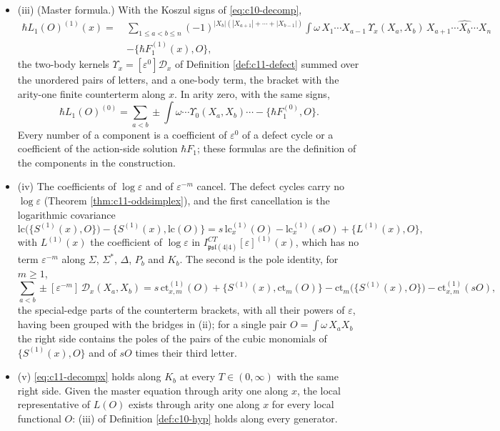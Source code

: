 \begin{theorem}
\begin{itemize}
\item (iii) (Master formula.) With the Koszul signs of \eqref{eq:c10-decomp},
\begin{equation}
\begin{aligned}
\hbar L_1(O)^{(1)}(x)=\ &\sum_{1\le a<b\le n}(-1)^{|X_b|(|X_{a+1}|+\cdots+|X_{b-1}|)}\int\omega\,X_1\cdots X_{a-1}\,\Upsilon_x(X_a,X_b)\,X_{a+1}\cdots\widehat{X_b}\cdots X_n\\
&-\big\{\hbar F_1^{(1)}(x),O\big\},
\end{aligned}
\label{eq:c11-decompx}
\end{equation}
the two-body kernels $\Upsilon_x=[\varepsilon^0]\mathcal D_x$ of Definition \ref{def:c11-defect} summed over the unordered pairs of letters, and a one-body term, the bracket with the arity-one finite counterterm along $x$. In arity zero, with the same signs,
\begin{equation}
\hbar L_1(O)^{(0)}=\sum_{a<b}\pm\int\omega\cdots\Upsilon_0(X_a,X_b)\cdots-\big\{\hbar F_1^{(0)},O\big\}.
\label{eq:c11-decomp0}
\end{equation}
Every number of a component is a coefficient of $\varepsilon^0$ of a defect cycle or a coefficient of the action-side solution $\hbar F_1$; these formulas are the definition of the components in the construction.
\item (iv) The coefficients of $\log\varepsilon$ and of $\varepsilon^{-m}$ cancel. The defect cycles carry no $\log\varepsilon$ (Theorem \ref{thm:c11-oddsimplex}), and the first cancellation is the logarithmic covariance
\begin{equation}
\mathrm{lc}\big(\{S^{(1)}(x),O\}\big)-\big\{S^{(1)}(x),\mathrm{lc}(O)\big\}=s\,\mathrm{lc}^{(1)}_x(O)-\mathrm{lc}^{(1)}_x(sO)+\big\{L^{(1)}(x),O\big\},
\label{eq:c11-logcov}
\end{equation}
with $L^{(1)}(x)$ the coefficient of $\log\varepsilon$ in $I^{CT}_{\mathfrak{psl}(4|4)}[\varepsilon]^{(1)}(x)$, which has no term $\varepsilon^{-m}$ along $\Sigma$, $\Sigma^*$, $\Delta$, $P_b$ and $K_b$. The second is the pole identity, for $m\ge1$,
\begin{equation}
\sum_{a<b}\pm[\varepsilon^{-m}]\,\mathcal D_x(X_a,X_b)=s\,\mathrm{ct}^{(1)}_{x,m}(O)+\big\{S^{(1)}(x),\mathrm{ct}_m(O)\big\}-\mathrm{ct}_m\big(\{S^{(1)}(x),O\}\big)-\mathrm{ct}^{(1)}_{x,m}(sO),
\label{eq:c11-pole}
\end{equation}
the special-edge parts of the counterterm brackets, with all their powers of $\varepsilon$, having been grouped with the bridges in (ii); for a single pair $O=\int\omega\,X_aX_b$ the right side contains the poles of the pairs of the cubic monomials of $\{S^{(1)}(x),O\}$ and of $sO$ times their third letter.
\item (v) \eqref{eq:c11-decompx} holds along $K_b$ at every $T\in(0,\infty)$ with the same right side. Given the master equation through arity one along $x$, the local representative of $L(O)$ exists through arity one along $x$ for every local functional $O$: (iii) of Definition \ref{def:c10-hyp} holds along every generator.
\end{itemize}
\end{theorem}

